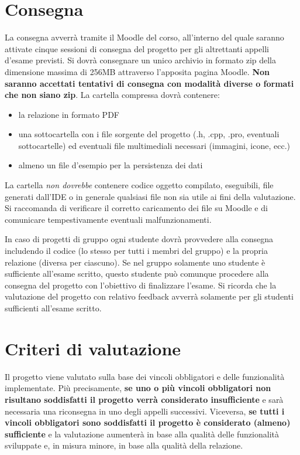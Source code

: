 \documentclass[10pt,a4paper,oneside]{article}
\begin{document}
\section{Consegna}
La consegna avverrà tramite il Moodle del corso, all'interno del quale saranno attivate cinque sessioni di consegna del progetto per gli altrettanti appelli d'esame previsti. Si dovrà consegnare un unico archivio in formato zip della dimensione massima di 256MB attraverso l'apposita pagina Moodle. \textbf{Non saranno accettati tentativi di consegna con modalità diverse o formati che non siano zip}. La cartella compressa dovrà contenere:
\begin{itemize}
 \item la relazione in formato PDF
 \item una sottocartella con i file sorgente del progetto (.h, .cpp, .pro, eventuali sottocartelle) ed eventuali file multimediali necessari (immagini, icone, ecc.)
 \item almeno un file d'esempio per la persistenza dei dati
\end{itemize}
La cartella \emph{non dovrebbe} contenere codice oggetto compilato, eseguibili, file generati dall'IDE o in generale qualsiasi file non sia utile ai fini della valutazione. Si raccomanda di verificare il corretto caricamento dei file su Moodle e di comunicare tempestivamente eventuali malfunzionamenti.

In caso di progetti di gruppo ogni studente dovrà provvedere alla consegna includendo il codice (lo stesso per tutti i membri del gruppo) e la propria relazione (diversa per ciascuno). Se nel gruppo solamente uno studente è sufficiente all'esame scritto, questo studente può comunque procedere alla consegna del progetto con l'obiettivo di finalizzare l'esame. Si ricorda che la valutazione del progetto con relativo feedback avverrà solamente per gli studenti sufficienti all'esame scritto.


\section{Criteri di valutazione}
Il progetto viene valutato sulla base dei vincoli obbligatori e delle funzionalità implementate. Più precisamente, \textbf{se uno o più vincoli obbligatori non risultano soddisfatti il progetto verrà considerato insufficiente} e sarà necessaria una riconsegna in uno degli appelli successivi. Viceversa, \textbf{se tutti i vincoli obbligatori sono soddisfatti il progetto è considerato (almeno) sufficiente} e la valutazione aumenterà in base alla qualità delle funzionalità sviluppate e, in misura minore, in base alla qualità della relazione.
\end{document}
